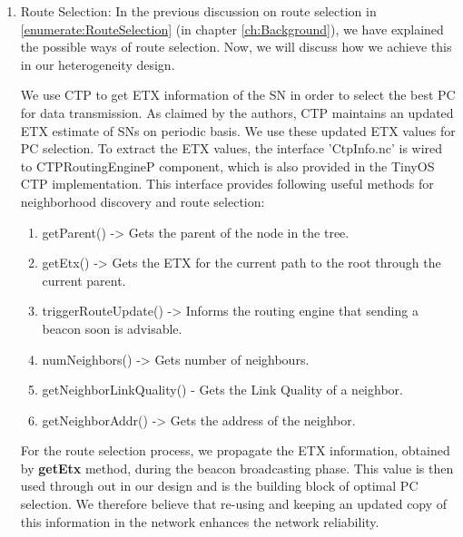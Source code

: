 \begin{enumerate}
        \item \label{item:routeSelection} Route Selection: In the previous discussion on route selection in \ref{enumerate:RouteSelection} (in chapter \ref{ch:Background}), we have explained the possible ways of route selection. Now, we will discuss how we achieve this in our heterogeneity design.
        
        \par
        We use \ac{CTP} to get \ac{ETX} information of the \ac{SN} in order to select the best \ac{PC} for data transmission. As claimed by the authors, \ac{CTP} maintains an updated \ac{ETX} estimate of \acp{SN} on periodic basis. We use these updated \ac{ETX} values for \ac{PC} selection. To extract the \ac{ETX} values, the interface 'CtpInfo.nc' is wired to CTPRoutingEngineP component, which is also provided in the TinyOS \ac{CTP} implementation. This interface provides following useful methods for neighborhood discovery and route selection:
        
        \begin{enumerate}
        	\item getParent() -> Gets the parent of the node in the tree.
        	
        	\item getEtx() -> Gets the \ac{ETX} for the current path to the root through the current parent.
        	
        	\item triggerRouteUpdate() -> Informs the routing engine that sending a beacon soon is advisable.
        	
        	\item numNeighbors() -> Gets number of neighbours.
        	
        	\item getNeighborLinkQuality() - Gets the Link Quality of a neighbor. 
        	
        	\item getNeighborAddr() -> Gets the address of the neighbor.
        \end{enumerate}
        
        \par
         For the route selection process, we propagate the \ac{ETX} information, obtained by  \textbf{getEtx} method, during the beacon broadcasting phase. This value is then used through out in our design and is the building block of optimal \ac{PC} selection. We therefore believe that re-using and keeping an updated copy of this information in the network enhances the network reliability.
        

\end{enumerate}
